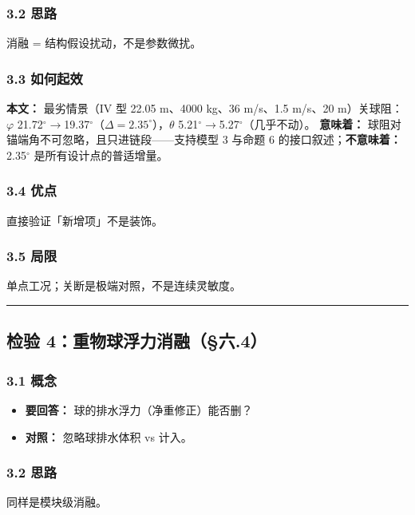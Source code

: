 \documentclass[UTF8,a4paper,zihao=-4]{ctexart}
\begin{document}
\subsubsection{\texorpdfstring{3.2 思路}{3.2 思路}}
消融 = 结构假设扰动，不是参数微扰。

\subsubsection{\texorpdfstring{3.3 如何起效}{3.3 如何起效}}
\textbf{本文：} 最劣情景（IV 型 22.05 m、4000 kg、36 m/s、1.5 m/s、20 m）关球阻：\(\varphi\) 21.72$^\circ$$\rightarrow$19.37$^\circ$（\(\Delta=2.35^\circ\)），\(\theta\) 5.21$^\circ$$\rightarrow$5.27$^\circ$（几乎不动）。  
\textbf{意味着：} 球阻对锚端角不可忽略，且只进链段------支持模型 3 与命题 6 的接口叙述；\textbf{不意味着：} 2.35$^\circ$ 是所有设计点的普适增量。

\subsubsection{\texorpdfstring{3.4 优点}{3.4 优点}}
直接验证「新增项」不是装饰。

\subsubsection{\texorpdfstring{3.5 局限}{3.5 局限}}
单点工况；关断是极端对照，不是连续灵敏度。

\vspace{0.4em}\hrule\vspace{0.4em}

\subsection{\texorpdfstring{检验 4：重物球浮力消融（§六.4）}{检验 4：重物球浮力消融（§六.4）}}

\subsubsection{\texorpdfstring{3.1 概念}{3.1 概念}}
\begin{itemize}[leftmargin=1.5em]
\item \textbf{要回答：} 球的排水浮力（净重修正）能否删？
\item \textbf{对照：} 忽略球排水体积 vs 计入。
\end{itemize}

\subsubsection{\texorpdfstring{3.2 思路}{3.2 思路}}
同样是模块级消融。
\end{document}
